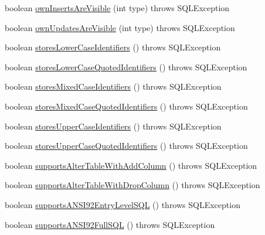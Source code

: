 \begin{DoxyCompactItemize}
\item 
boolean \mbox{\hyperlink{classcom_1_1mysql_1_1jdbc_1_1_database_meta_data_a667e7101e62d70b67e7884ad1c2dcded}{own\+Inserts\+Are\+Visible}} (int type)  throws S\+Q\+L\+Exception 
\item 
boolean \mbox{\hyperlink{classcom_1_1mysql_1_1jdbc_1_1_database_meta_data_a4eae1eb0f208f93e0c65986c88e6a50a}{own\+Updates\+Are\+Visible}} (int type)  throws S\+Q\+L\+Exception 
\item 
boolean \mbox{\hyperlink{classcom_1_1mysql_1_1jdbc_1_1_database_meta_data_a2481785bbb25f538675cacd937c127b5}{stores\+Lower\+Case\+Identifiers}} ()  throws S\+Q\+L\+Exception 
\item 
boolean \mbox{\hyperlink{classcom_1_1mysql_1_1jdbc_1_1_database_meta_data_a687f3a09aca49d6941ac1df05e20b781}{stores\+Lower\+Case\+Quoted\+Identifiers}} ()  throws S\+Q\+L\+Exception 
\item 
boolean \mbox{\hyperlink{classcom_1_1mysql_1_1jdbc_1_1_database_meta_data_aba8c815b25aaa30b3ba002eacfbdc5be}{stores\+Mixed\+Case\+Identifiers}} ()  throws S\+Q\+L\+Exception 
\item 
boolean \mbox{\hyperlink{classcom_1_1mysql_1_1jdbc_1_1_database_meta_data_af5f253c9ecac331a3ef18b569f5b43c3}{stores\+Mixed\+Case\+Quoted\+Identifiers}} ()  throws S\+Q\+L\+Exception 
\item 
boolean \mbox{\hyperlink{classcom_1_1mysql_1_1jdbc_1_1_database_meta_data_af0fcbeeedd6fdcc5097dec36fedb87dd}{stores\+Upper\+Case\+Identifiers}} ()  throws S\+Q\+L\+Exception 
\item 
boolean \mbox{\hyperlink{classcom_1_1mysql_1_1jdbc_1_1_database_meta_data_aa9da945ccf1459f6732a406f5dc4dbba}{stores\+Upper\+Case\+Quoted\+Identifiers}} ()  throws S\+Q\+L\+Exception 
\item 
boolean \mbox{\hyperlink{classcom_1_1mysql_1_1jdbc_1_1_database_meta_data_a07eb0ac9ab8a56f89de3feb8b156caa0}{supports\+Alter\+Table\+With\+Add\+Column}} ()  throws S\+Q\+L\+Exception 
\item 
boolean \mbox{\hyperlink{classcom_1_1mysql_1_1jdbc_1_1_database_meta_data_a344be63fbe3a69b9c5363a4d84a9daba}{supports\+Alter\+Table\+With\+Drop\+Column}} ()  throws S\+Q\+L\+Exception 
\item 
boolean \mbox{\hyperlink{classcom_1_1mysql_1_1jdbc_1_1_database_meta_data_a2c332fa7cf8062b47c89e9cf704d8692}{supports\+A\+N\+S\+I92\+Entry\+Level\+S\+QL}} ()  throws S\+Q\+L\+Exception 
\item 
boolean \mbox{\hyperlink{classcom_1_1mysql_1_1jdbc_1_1_database_meta_data_a2d51b362ac9ceb69e34e44307d8ba4f1}{supports\+A\+N\+S\+I92\+Full\+S\+QL}} ()  throws S\+Q\+L\+Exception 

\end{DoxyCompactItemize}
